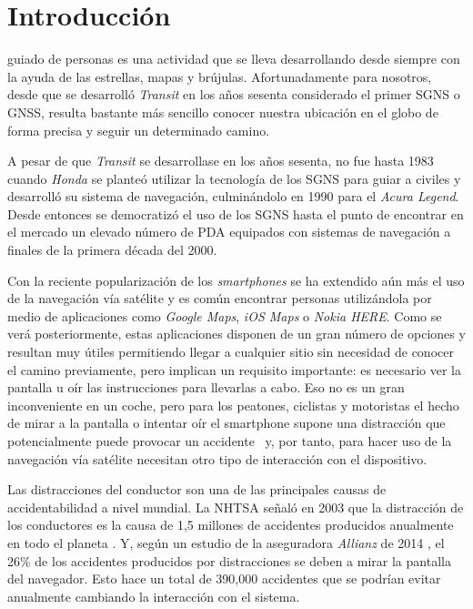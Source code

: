 \chapter{Introducción}
\label{chap:intro}

 guiado de personas es una actividad que se lleva desarrollando desde siempre con la
ayuda de las estrellas, mapas y brújulas. Afortunadamente para nosotros, desde que se desarrolló
\emph{Transit} en los años sesenta considerado el primer \acf{SGNS} o \acf{GNSS}, resulta
bastante más sencillo conocer nuestra ubicación en el globo de forma precisa y seguir un determinado
camino.

A pesar de que \emph{Transit} se desarrollase en los años sesenta, no fue hasta 1983 cuando
\emph{Honda} se planteó utilizar la tecnología de los \acs{SGNS} para guiar a civiles y desarrolló
su sistema de navegación, culminándolo en 1990 para el \emph{Acura Legend}. Desde entonces se
democratizó el uso de los \acs{SGNS} hasta el punto de encontrar en el mercado un elevado número de
\acf{PDA} equipados con sistemas de navegación a finales de la primera década del 2000.

Con la reciente popularización de los \emph{smartphones} se ha extendido aún más el uso de la
navegación vía satélite y es común encontrar personas utilizándola por medio de aplicaciones como
\emph{Google Maps}, \emph{iOS Maps} o \emph{Nokia HERE}. Como se verá posteriormente, estas
aplicaciones disponen de un gran número de opciones y resultan muy útiles permitiendo llegar
a cualquier sitio sin necesidad de conocer el camino previamente, pero implican un requisito
importante: es necesario ver la pantalla u oír las instrucciones para llevarlas a cabo. Eso no es un
gran inconveniente en un coche, pero para los peatones, ciclistas y motoristas el hecho de mirar a
la pantalla o intentar oír el smartphone supone una distracción que potencialmente puede provocar un
accidente~\cite{Valcarcel12} y, por tanto, para hacer uso de la navegación vía satélite necesitan
otro tipo de interacción con el dispositivo.

Las distracciones del conductor son una de las principales causas de accidentabilidad a nivel
mundial. La \acf{NHTSA} señaló en 2003 que la distracción de los conductores es la causa de 1,5
millones de accidentes producidos anualmente en todo el planeta \cite{RACC03}. Y, según un estudio
de la aseguradora \emph{Allianz} de 2014 \cite{Allianz14}, el 26\% de los accidentes producidos por
distracciones se deben a mirar la pantalla del navegador. Esto hace un total de 390,000 accidentes
que se podrían evitar anualmente cambiando la interacción con el sistema.

